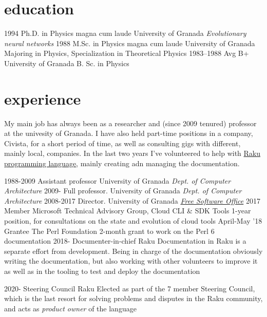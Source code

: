 \documentclass[]{friggeri-jj-cv}
\begin{document}
\section{education}

\begin{entrylist}
  \entry
    {1994}
    {Ph.D. {\normalfont in Physics} magna cum laude}
    {University of Granada}
    {\emph{Evolutionary neural networks}}
  \entry
    {1988}
    {M.Sc. {\normalfont in Physics} magna cum laude}
    {University of Granada}
    {Majoring in Physics, Specialization in Theoretical Physics}
  \entry
    {1983–1988}
    {Avg B+}
    {University of Granada}
    {B. Sc. in Physics}
\end{entrylist}

\section{experience}

My main job has always been as a researcher and (since 2009 tenured)
professor at the univesity of Granada. I have also held part-time
positions in a company, Civista, for a short period of time, as well
as consulting gigs with different, mainly local, companies. In the
last two years I've volunteered to help with
\href{https://raku.org}{Raku programming language}, mainly creating
adn managing the documentation.

\begin{entrylist}
  \entry
    {1988-2009}
    {Assistant professor}
    {University of Granada}
    {\emph{Dept. of Computer Architecture}}
  \entry
    {2009-}
    {Full professor.}
    {University of Granada}
    {\emph{Dept. of Computer Architecture}}
    \entry
    {2008-2017}
    {Director.}
    {University of Granada}
    {\href{http://osl.ugr.es}{\emph{Free Software Office}}}
    \entry
    {2017}
    {Member}
    {Microsoft Technical Advisory Group, Cloud CLI \& SDK Tools}
    {1-year position, for consultations on the state and evolution of
      cloud tools}
    \entry
    {April-May '18}
    {Grantee}
    {The Perl Foundation}
    {2-month grant to work on the Perl 6 documentation}
    \entry
    {2018-}
    {Documenter-in-chief}
    {Raku}
    {Documentation in Raku is a separate effort from
      development. Being in charge of the documentation obviously
      writing the documentation, but also working with other
      volunteers to improve it as well as in the tooling to test and
      deploy the documentation}

        \entry
    {2020-}
    {Steering Council}
    {Raku}
    {Elected as part of the 7 member Steering Council, which is the
      last resort for solving problems and disputes in the Raku
      community, and acts as {\em product owner} of the language}
\end{entrylist}
\end{document}
